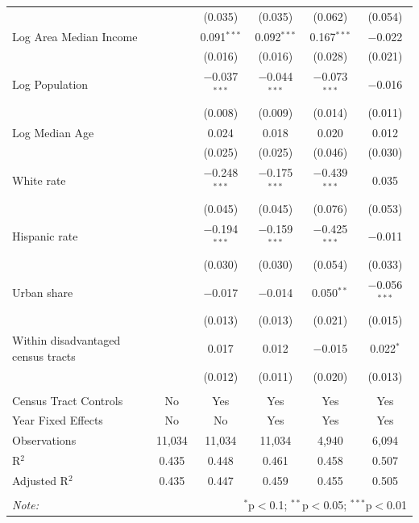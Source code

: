 \documentclass[11pt,twoside,letterpaper]{article}
\begin{document}
\begin{table}[H]
{\begin{tabular}{@{\extracolsep{5pt}}lccccc}
  &  & (0.035) & (0.035) & (0.062) & (0.054) \\ 
  Log Area Median Income &  & 0.091$^{***}$ & 0.092$^{***}$ & 0.167$^{***}$ & $-$0.022 \\ 
  &  & (0.016) & (0.016) & (0.028) & (0.021) \\ 
  Log Population &  & $-$0.037$^{***}$ & $-$0.044$^{***}$ & $-$0.073$^{***}$ & $-$0.016 \\ 
  &  & (0.008) & (0.009) & (0.014) & (0.011) \\ 
  Log Median Age &  & 0.024 & 0.018 & 0.020 & 0.012 \\ 
  &  & (0.025) & (0.025) & (0.046) & (0.030) \\ 
  White rate &  & $-$0.248$^{***}$ & $-$0.175$^{***}$ & $-$0.439$^{***}$ & 0.035 \\ 
  &  & (0.045) & (0.045) & (0.076) & (0.053) \\ 
  Hispanic rate &  & $-$0.194$^{***}$ & $-$0.159$^{***}$ & $-$0.425$^{***}$ & $-$0.011 \\ 
  &  & (0.030) & (0.030) & (0.054) & (0.033) \\ 
  Urban share &  & $-$0.017 & $-$0.014 & 0.050$^{**}$ & $-$0.056$^{***}$ \\ 
  &  & (0.013) & (0.013) & (0.021) & (0.015) \\ 
  Within disadvantaged census tracts &  & 0.017 & 0.012 & $-$0.015 & 0.022$^{*}$ \\ 
  &  & (0.012) & (0.011) & (0.020) & (0.013) \\ 
 \hline \\[-1.8ex] 
Census Tract Controls & No & Yes & Yes & Yes & Yes \\ 
Year Fixed Effects & No & No & Yes & Yes & Yes \\ 
Observations & 11,034 & 11,034 & 11,034 & 4,940 & 6,094 \\ 
R$^{2}$ & 0.435 & 0.448 & 0.461 & 0.458 & 0.507 \\ 
Adjusted R$^{2}$ & 0.435 & 0.447 & 0.459 & 0.455 & 0.505 \\ 
\hline 
\hline \\[-1.8ex] 
\textit{Note:}  & \multicolumn{5}{r}{$^{*}$p$<$0.1; $^{**}$p$<$0.05; $^{***}$p$<$0.01} \\ 
\end{tabular} }
\end{table} 


\newpage

\printbibliography
\end{document}
